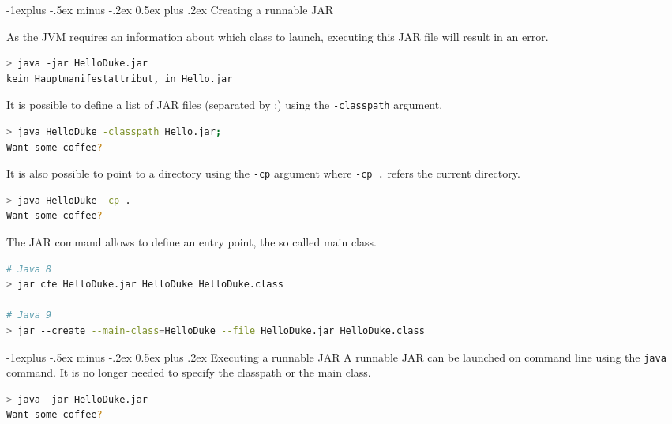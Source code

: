\documentclass[10pt,landscape,a4paper]{article}
\makeatletter
\renewcommand{\subsection}{\@startsection{subsection}{2}{0mm}%
                                {-1explus -.5ex minus -.2ex}%
                                {0.5ex plus .2ex}%
                                {\normalfont\normalsize\bfseries}}
\makeatother
\begin{document}
\begin{multicols}{2}
\subsection{Creating a runnable JAR}

As the JVM requires an information about which class to launch, executing this JAR file will result in an error.
\begin{lstlisting}[language=bash,frame=single]
> java -jar HelloDuke.jar
kein Hauptmanifestattribut, in Hello.jar
\end{lstlisting}
It is possible to define a list of JAR files (separated by ;) using the \texttt{-classpath} argument.
\begin{lstlisting}[language=bash,frame=single]
> java HelloDuke -classpath Hello.jar;
Want some coffee?

\end{lstlisting}
It is also possible to point to a directory using the  \texttt{-cp} argument where  \texttt{-cp .} refers the current directory.
\begin{lstlisting}[language=bash,frame=single]
> java HelloDuke -cp .
Want some coffee?

\end{lstlisting}
The JAR command allows to define an entry point, the so called main class. 
\begin{lstlisting}[language=bash,frame=single,breaklines=true]
# Java 8 
> jar cfe HelloDuke.jar HelloDuke HelloDuke.class

# Java 9 
> jar --create --main-class=HelloDuke --file HelloDuke.jar HelloDuke.class
\end{lstlisting}

\subsection{Executing a runnable JAR}
A runnable JAR can be launched on command line using the \texttt{java} command. It is no longer needed to specify the classpath or the main class.  
\begin{lstlisting}[language=bash,frame=single]
> java -jar HelloDuke.jar
Want some coffee?


\end{lstlisting}
\end{multicols}
\end{document}
